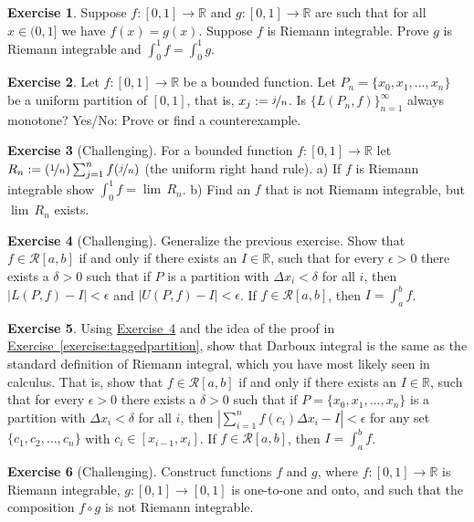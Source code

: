 \documentclass[12pt]{book}
\newcommand{\abs}[1]{\left\lvert {#1} \right\rvert}
\newcommand{\R}{{\mathbb{R}}}
\newcommand{\sR}{{\mathcal{R}}}
\theoremstyle{plain}
\theoremstyle{remark}
\theoremstyle{definition}
\theoremstyle{exercise}
\newtheorem{exercise}{Exercise}[section]
\theoremstyle{example}
\newcommand{\exerciseref}[1]{\hyperref[#1]{Exercise~\ref*{#1}}}
\begin{document}
\begin{exercise}
Suppose $f \colon [0,1] \to \R$ and $g \colon [0,1] \to \R$
are such that for all $x \in (0,1]$
we have $f(x) = g(x)$.  Suppose $f$ is Riemann integrable. 
Prove $g$ is Riemann integrable and $\int_{0}^1 f = \int_{0}^1 g$.
\end{exercise}

\begin{exercise}
Let $f \colon [0,1] \to \R$ be a bounded function.
Let $P_n = \{ x_0,x_1,\ldots,x_n \}$ be a uniform partition of $[0,1]$,
that is, $x_j := \nicefrac{j}{n}$.  Is $\{ L(P_n,f) \}_{n=1}^\infty$
always monotone?  Yes/No: Prove or find a counterexample.
\end{exercise}

\begin{exercise}[Challenging]
For a bounded function $f \colon [0,1] \to \R$ let
$R_n := (\nicefrac{1}{n})\sum_{j=1}^n f(\nicefrac{j}{n})$ (the
uniform right hand rule).
a) If $f$ is Riemann integrable show $\int_0^1 f = \lim \, R_n$.
b) Find an $f$ that is not Riemann integrable, but $\lim \, R_n$ exists.
\end{exercise}

\begin{exercise}[Challenging] \label{exercise:riemannintdarboux}
Generalize the previous exercise.
Show that $f \in \sR[a,b]$ if and only if there exists an $I \in \R$,
such that for every $\epsilon > 0$ there exists
a $\delta > 0$ such that if $P$ is a partition with $\Delta x_i < \delta$
for all $i$, then
$\abs{L(P,f) - I} < \epsilon$ and
$\abs{U(P,f) - I} < \epsilon$.  If $f \in \sR[a,b]$, then $I = \int_a^b f$.
\end{exercise}

\begin{exercise}
Using \exerciseref{exercise:riemannintdarboux} and the idea of
the proof in \exerciseref{exercise:taggedpartition}, show that 
Darboux integral is the same as the standard definition
of Riemann integral, which you have most likely seen in calculus.  That is,
show that
$f \in \sR[a,b]$ if and only if there exists an $I \in \R$,
such that for every $\epsilon > 0$ there exists
a $\delta > 0$ such that if $P = \{ x_0,x_1,\ldots,x_n \}$
is a partition with $\Delta x_i < \delta$
for all $i$, then
$\abs{\sum_{i=1}^n f(c_i) \Delta x_i - I} < \epsilon$ for any set
$\{ c_1,c_2,\ldots,c_n \}$ with $c_i \in [x_{i-1},x_i]$.
If $f \in \sR[a,b]$, then $I = \int_a^b f$.
\end{exercise}


\begin{exercise}[Challenging]
Construct functions $f$ and $g$, 
where
$f \colon [0,1] \to \R$ is Riemann integrable,
$g \colon [0,1] \to [0,1]$ is one-to-one and onto,
and such that the composition $f \circ g$ is not Riemann integrable.
\end{exercise}
\end{document}
